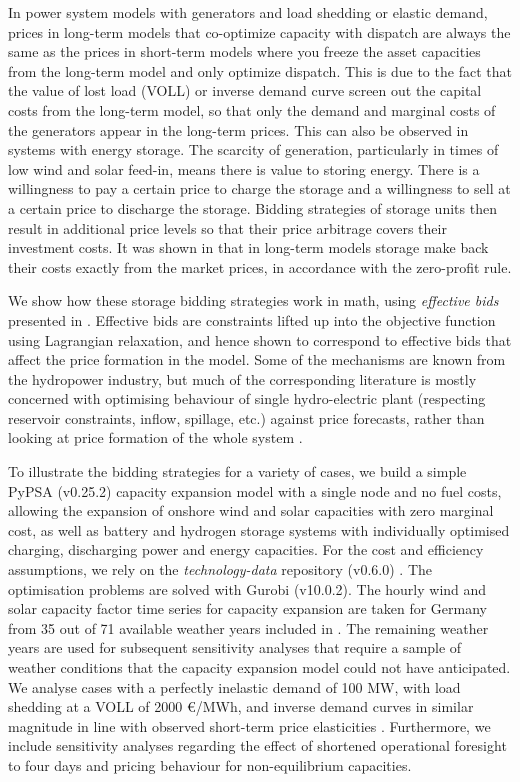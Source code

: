 \documentclass[final,3p]{elsarticle}
\begin{document}
In power system models with generators and load shedding or elastic demand,
prices in long-term models that co-optimize capacity with dispatch are always
the same as the prices in short-term models where you freeze the asset
capacities from the long-term model and only optimize dispatch. This is due to
the fact that the value of lost load (VOLL)  or inverse demand curve screen out
the capital costs from the long-term model, so that only the demand and marginal
costs of the generators appear in the long-term prices. This can also be
observed in systems with energy storage. The scarcity of generation,
particularly in times of low wind and solar feed-in, means there is value to
storing energy. There is a willingness to pay a certain price to charge the
storage and a willingness to sell at a certain price to discharge the storage.
Bidding strategies of storage units then result in additional price levels so
that their price arbitrage covers their investment costs. It was shown in
\cite{Brown2020} that in long-term models storage make back their costs exactly
from the market prices, in accordance with the zero-profit rule. 

We show how these storage bidding strategies work in math, using
\textit{effective bids} presented in \cite{Brown2020}. Effective bids are
constraints lifted up into the objective function using Lagrangian relaxation,
and hence shown to correspond to effective bids that affect the price formation
in the model. Some of the mechanisms are known from the hydropower industry, but
much of the corresponding literature is mostly concerned with optimising
behaviour of single hydro-electric plant (respecting reservoir constraints,
inflow, spillage, etc.) against price forecasts, rather than looking at price
formation of the whole system
\cite{lederer1984overall,Pereira1989,Rotting1992,Fosso1999,CRAMPES2019100746}.

To illustrate the bidding strategies for a variety of cases, we build a simple
PyPSA (v0.25.2) \cite{PyPSA} capacity expansion model with a single node and no
fuel costs, allowing the expansion of onshore wind and solar capacities with
zero marginal cost, as well as battery and hydrogen storage systems with
individually optimised charging, discharging power and energy capacities. For
the cost and efficiency assumptions, we rely on the \textit{technology-data}
repository (v0.6.0) \cite{lisazeyenPyPSATechnologydata2023}. The optimisation
problems are solved with Gurobi (v10.0.2). The hourly wind and solar capacity
factor time series for capacity expansion are taken for Germany from 35 out of
71 available weather years included in \cite{rdgdr321}. The remaining weather
years are used for subsequent sensitivity analyses that require a sample of
weather conditions that the capacity expansion model could not have anticipated.
We analyse cases with a perfectly inelastic demand of 100 MW, with load shedding
at a VOLL of 2000 \euro/MWh, and inverse demand curves in similar magnitude in
line with observed short-term price elasticities \cite{hirthHowAggregate2023,RePEc:zbw:esprep:272048}.
Furthermore, we include sensitivity analyses regarding the effect of shortened
operational foresight to four days and pricing behaviour for non-equilibrium
capacities.
\end{document}
